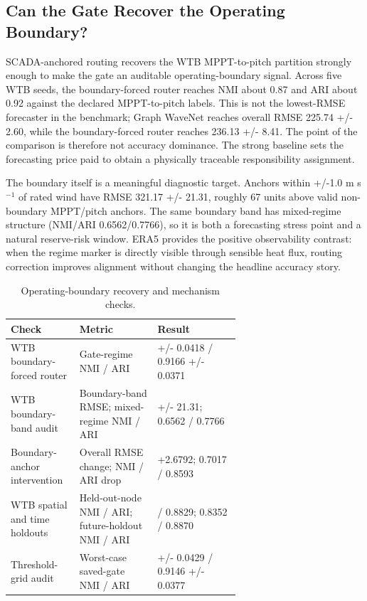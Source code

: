 \documentclass[
  11pt]{article}
\begin{document}
\subsection{Can the Gate Recover the Operating
Boundary?}\label{can-the-gate-recover-the-operating-boundary}

SCADA-anchored routing recovers the WTB MPPT-to-pitch partition strongly
enough to make the gate an auditable operating-boundary signal. Across
five WTB seeds, the boundary-forced router reaches NMI about 0.87 and
ARI about 0.92 against the declared MPPT-to-pitch labels. This is not
the lowest-RMSE forecaster in the benchmark; Graph WaveNet reaches
overall RMSE 225.74 +/- 2.60, while the boundary-forced router reaches
236.13 +/- 8.41. The point of the comparison is therefore not accuracy
dominance. The strong baseline sets the forecasting price paid to obtain
a physically traceable responsibility assignment.

The boundary itself is a meaningful diagnostic target. Anchors within
+/-1.0 m s\(^{-1}\) of rated wind have RMSE 321.17 +/- 21.31, roughly 67
units above valid non-boundary MPPT/pitch anchors. The same boundary
band has mixed-regime structure (NMI/ARI 0.6562/0.7766), so it is both a
forecasting stress point and a natural reserve-risk window. ERA5
provides the positive observability contrast: when the regime marker is
directly visible through sensible heat flux, routing correction improves
alignment without changing the headline accuracy story.

\begin{table}[H]
\centering
\footnotesize
\setlength{\tabcolsep}{4pt}
\renewcommand{\arraystretch}{1.08}
\caption{Operating-boundary recovery and mechanism checks.}
\begin{tabularx}{0.98\linewidth}{>{\raggedright\arraybackslash}p{0.30\linewidth} >{\raggedright\arraybackslash}p{0.34\linewidth} >{\raggedright\arraybackslash}X}
\toprule
Check & Metric & Result \\
\midrule
WTB boundary-forced router & Gate-regime NMI / ARI & 0.8716 +/- 0.0418 / 0.9166 +/- 0.0371 \\
WTB boundary-band audit & Boundary-band RMSE; mixed-regime NMI / ARI & 321.17 +/- 21.31; 0.6562 / 0.7766 \\
Boundary-anchor intervention & Overall RMSE change; NMI / ARI drop & +2.6792; 0.7017 / 0.8593 \\
WTB spatial and time holdouts & Held-out-node NMI / ARI; future-holdout NMI / ARI & 0.8340 / 0.8829; 0.8352 / 0.8870 \\
Threshold-grid audit & Worst-case saved-gate NMI / ARI & 0.8655 +/- 0.0429 / 0.9146 +/- 0.0377 \\
\bottomrule
\end{tabularx}
\end{table}
\end{document}
